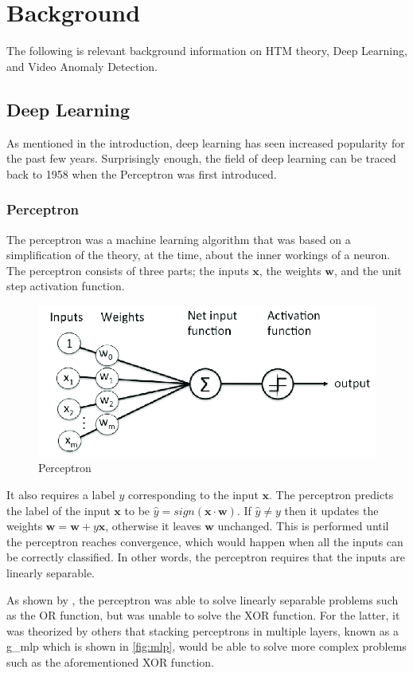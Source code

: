 \chapter{Background}
The following is relevant background information on HTM theory, Deep Learning, and Video Anomaly Detection.
\section{Deep Learning}
As mentioned in the introduction, deep learning has seen increased popularity for the past few years. Surprisingly enough, the field of deep learning can be traced back to 1958 when the Perceptron\cite{perceptron,perceptron2} was first introduced.
\subsection{Perceptron}
The perceptron\cite{perceptron, perceptron2} was a machine learning algorithm that was based on a simplification of the theory, at the time, about the inner workings of a neuron. The perceptron consists of three parts; the inputs $\mathbf{x}$, the weights $\mathbf{w}$, and the unit step activation function.
\begin{figure}[H]
    \centering
    \includegraphics[width=0.6\linewidth]{resources/related_works/perceptron.png}
    \caption{Perceptron}
\end{figure}
It also requires a label $y$ corresponding to the input $\mathbf{x}$. The perceptron predicts the label of the input $\mathbf{x}$ to be $\hat{y}=sign(\mathbf{x}\cdot\mathbf{w})$. If $\hat{y}\neq y$ then it updates the weights $\mathbf{w}=\mathbf{w}+y\mathbf{x}$, otherwise it leaves $\mathbf{w}$ unchanged. This is performed until the perceptron reaches convergence, which would happen when all the inputs can be correctly classified. In other words, the perceptron requires that the inputs are linearly separable.
\par
As shown by \textcite{perceptron3}, the perceptron was able to solve linearly separable problems such as the OR function, but was unable to solve the XOR function. For the latter, it was theorized by others that stacking perceptrons in multiple layers, known as a \gls*{g_mlp} which is shown in \autoref{fig:mlp}, would be able to solve more complex problems such as the aforementioned XOR function\cite{perceptron_misconceptions}.

